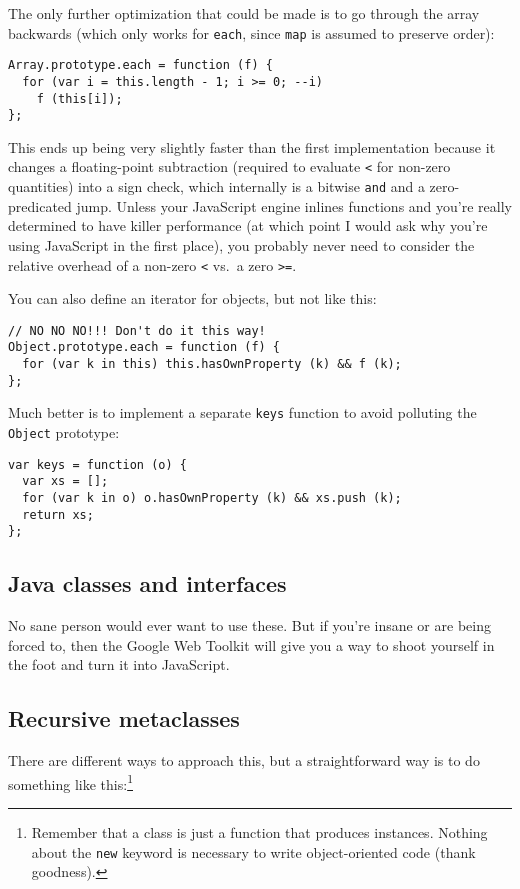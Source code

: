 \documentclass{article}
\begin{document}
    The only further optimization that could be made is to go through the array backwards (which only works for \verb|each|, since \verb|map| is assumed to preserve order):

\begin{verbatim}
Array.prototype.each = function (f) {
  for (var i = this.length - 1; i >= 0; --i)
    f (this[i]);
};
\end{verbatim}

    This ends up being very slightly faster than the first implementation because it changes a floating-point subtraction (required to evaluate \verb|<| for non-zero quantities) into a sign
    check, which internally is a bitwise \verb|and| and a zero-predicated jump. Unless your JavaScript engine inlines functions and you're really determined to have killer performance (at
    which point I would ask why you're using JavaScript in the first place), you probably never need to consider the relative overhead of a non-zero \verb|<| vs.~a zero \verb|>=|.

    You can also define an iterator for objects, but not like this:

\begin{verbatim}
// NO NO NO!!! Don't do it this way!
Object.prototype.each = function (f) {
  for (var k in this) this.hasOwnProperty (k) && f (k);
};
\end{verbatim}

    Much better is to implement a separate \verb|keys| function to avoid polluting the \verb|Object| prototype:

\begin{verbatim}
var keys = function (o) {
  var xs = [];
  for (var k in o) o.hasOwnProperty (k) && xs.push (k);
  return xs;
};
\end{verbatim}

\subsection {Java classes and interfaces}
    No sane person would ever want to use these. But if you're insane or are being forced to, then the Google Web Toolkit will give you a way to shoot yourself in the foot and turn it into
    JavaScript.

\subsection {Recursive metaclasses}
    There are different ways to approach this, but a straightforward way is to do something like this:\footnote{Remember that a class is just a function that produces instances. Nothing about
    the {\tt new} keyword is necessary to write object-oriented code (thank goodness).}
\end{document}
